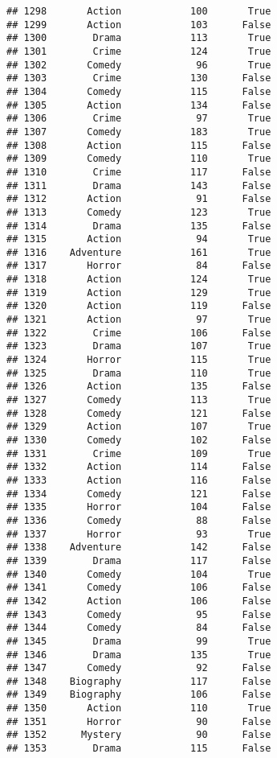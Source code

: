 \documentclass[
]{article}
\begin{document}
\begin{verbatim}
## 1298       Action            100       True
## 1299       Action            103      False
## 1300        Drama            113       True
## 1301        Crime            124       True
## 1302       Comedy             96       True
## 1303        Crime            130      False
## 1304       Comedy            115      False
## 1305       Action            134      False
## 1306        Crime             97       True
## 1307       Comedy            183       True
## 1308       Action            115      False
## 1309       Comedy            110       True
## 1310        Crime            117      False
## 1311        Drama            143      False
## 1312       Action             91      False
## 1313       Comedy            123       True
## 1314        Drama            135      False
## 1315       Action             94       True
## 1316    Adventure            161       True
## 1317       Horror             84      False
## 1318       Action            124       True
## 1319       Action            129       True
## 1320       Action            119      False
## 1321       Action             97       True
## 1322        Crime            106      False
## 1323        Drama            107       True
## 1324       Horror            115       True
## 1325        Drama            110       True
## 1326       Action            135      False
## 1327       Comedy            113       True
## 1328       Comedy            121      False
## 1329       Action            107       True
## 1330       Comedy            102      False
## 1331        Crime            109       True
## 1332       Action            114      False
## 1333       Action            116      False
## 1334       Comedy            121      False
## 1335       Horror            104      False
## 1336       Comedy             88      False
## 1337       Horror             93       True
## 1338    Adventure            142      False
## 1339        Drama            117      False
## 1340       Comedy            104       True
## 1341       Comedy            106      False
## 1342       Action            106      False
## 1343       Comedy             95      False
## 1344       Comedy             84      False
## 1345        Drama             99       True
## 1346        Drama            135       True
## 1347       Comedy             92      False
## 1348    Biography            117      False
## 1349    Biography            106      False
## 1350       Action            110       True
## 1351       Horror             90      False
## 1352      Mystery             90      False
## 1353        Drama            115      False

\end{verbatim}
\end{document}
